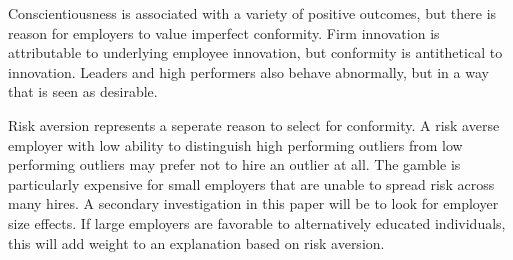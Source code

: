\documentclass[review]{elsarticle}
\begin{document}
Conscientiousness is associated with a variety of positive outcomes,
but there is reason for employers to value imperfect conformity.
Firm innovation is attributable to underlying employee innovation, but conformity is antithetical to innovation. %
Leaders and high performers also behave abnormally, but in a way that is seen as desirable.

Risk aversion represents a seperate reason to select for conformity.
A risk averse employer with low ability to distinguish high performing outliers from low performing outliers may prefer not to hire an outlier at all.
The gamble is particularly expensive for small employers that are unable to spread risk across many hires.
A secondary investigation in this paper will be to look for employer size effects.
If large employers are favorable to alternatively educated individuals, this will add weight to an explanation based on risk aversion.


\end{document}
